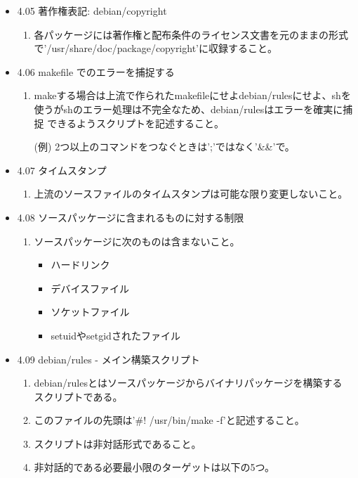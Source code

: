 \documentclass[mingoth,a4paper]{jsarticle}
\begin{document}
\begin{itemize}
\begin{itembox}[l]{実際にビルドしてみよう。}
    参照先：\url{http://www.debian.org/doc/manuals/maint-guide/build.ja.html}
  \end{itembox}

\item 4.05 著作権表記: debian/copyright
  \begin{enumerate}
  \item 各パッケージには著作権と配布条件のライセンス文書を元のままの形式で'/usr/share/doc/package/copyright'に収録すること。
  \end{enumerate}

\item 4.06 makefile でのエラーを捕捉する
  \begin{enumerate}
  \item makeする場合は上流で作られたmakefileにせよdebian/rulesにせよ、shを
    使うがshのエラー処理は不完全なため、debian/rulesはエラーを確実に捕捉
    できるようスクリプトを記述すること。

    (例) 2つ以上のコマンドをつなぐときは';'ではなく'\&\&'で。
  \end{enumerate}

\item 4.07 タイムスタンプ
  \begin{enumerate}
  \item 上流のソースファイルのタイムスタンプは可能な限り変更しないこと。
  \end{enumerate}

\item 4.08 ソースパッケージに含まれるものに対する制限
  \begin{enumerate}
  \item ソースパッケージに次のものは含まないこと。
    \begin{itemize}
    \item ハードリンク
    \item デバイスファイル
    \item ソケットファイル
    \item setuidやsetgidされたファイル
    \end{itemize}
  \end{enumerate}

\item 4.09 debian/rules - メイン構築スクリプト
  \begin{enumerate}
  \item debian/rulesとはソースパッケージからバイナリパッケージを構築する
    スクリプトである。
  \item  このファイルの先頭は'\#! /usr/bin/make -f'と記述すること。
  \item  スクリプトは非対話形式であること。
  \item  非対話的である必要最小限のターゲットは以下の5つ。


\end{enumerate}
\end{itemize}
\end{document}
